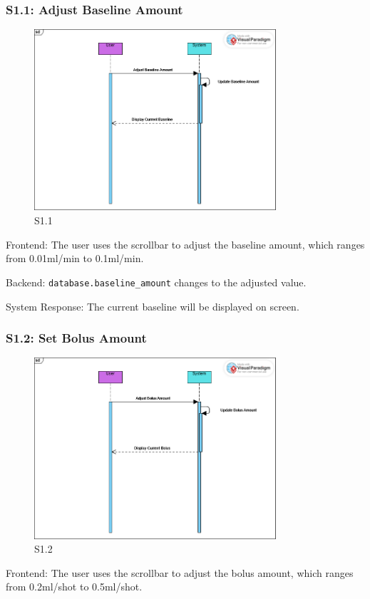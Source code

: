 \documentclass{article}
\begin{document}
\subsubsection*{S1.1: Adjust Baseline Amount}
\begin{figure}[htbp]
  \centering
  \includegraphics[width=0.8\textwidth]{img/S1_1.png}
  \caption{S1.1}
\end{figure}
Frontend: The user uses the scrollbar to adjust the baseline amount, which ranges from 0.01ml/min to 0.1ml/min.

Backend: \lstinline!database.baseline_amount! changes to the adjusted value.

System Response: The current baseline will be displayed on screen.
\subsubsection*{S1.2: Set Bolus Amount}
\begin{figure}[htbp]
  \centering
  \includegraphics[width=0.8\textwidth]{img/S1_2.png}
  \caption{S1.2}
\end{figure}
Frontend: The user uses the scrollbar to adjust the bolus amount, which ranges from 0.2ml/shot to 0.5ml/shot.
\end{document}
